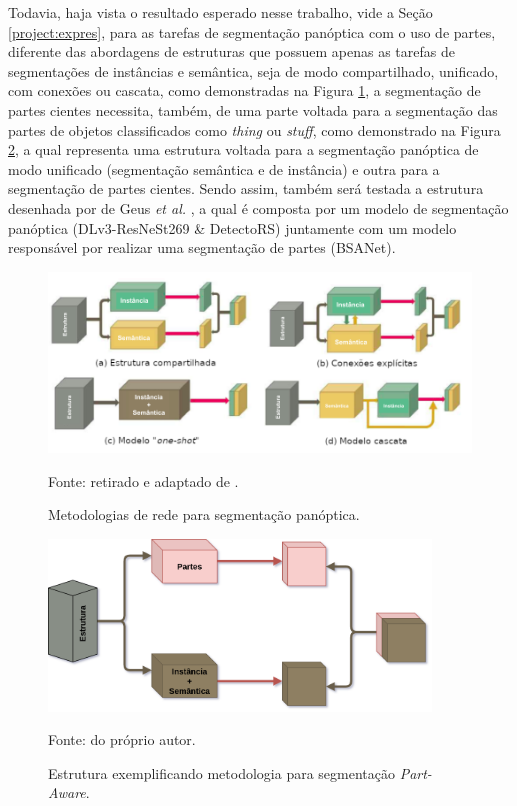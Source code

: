 Todavia, haja vista o resultado esperado nesse trabalho, vide a Seção \ref{project:expres}, para as tarefas de segmentação panóptica com o uso de partes, diferente das abordagens de estruturas que possuem apenas as tarefas de segmentações de instâncias e semântica, seja de modo compartilhado, unificado, com conexões ou cascata, como demonstradas na Figura \ref{project:method:fig:1}, a segmentação de partes cientes necessita, também, de uma parte voltada para a segmentação das partes de objetos classificados como \textit{thing} ou \textit{stuff}, como demonstrado na Figura \ref{project:method:fig:2}, a qual representa uma estrutura voltada para a segmentação panóptica de modo unificado (segmentação semântica e de instância) e outra para a segmentação de partes cientes. Sendo assim, também será testada a estrutura desenhada por de Geus \textit{et al.} \cite{DeGeus2021}, a qual é composta por um modelo de segmentação panóptica (DLv3-ResNeSt269 \& DetectoRS) juntamente com um modelo responsável por realizar uma segmentação de partes (BSANet).

\begin{figure}[H]
    \centering
    \caption{Metodologias de rede para segmentação panóptica.}
    \includegraphics[width=1\textwidth]{recursos/imagens/proposal/model_methodologies.png}
    \label{project:method:fig:1}

    Fonte: retirado e adaptado de \cite{Elharrouss2021}.
\end{figure}

\begin{figure}[H]
    \centering
    \caption{Estrutura exemplificando metodologia para segmentação \textit{Part-Aware}.}
    \includegraphics[width=4in]{recursos/imagens/proposal/estrutura.png}
    \label{project:method:fig:2}

    Fonte: do próprio autor.
\end{figure}

